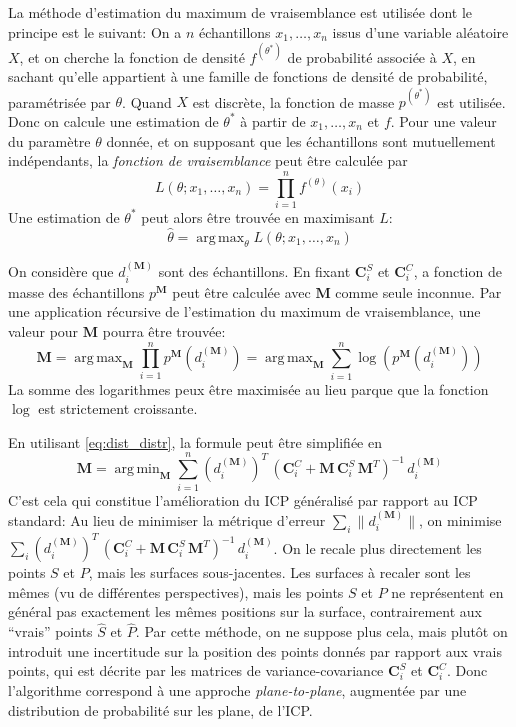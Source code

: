 \documentclass[a4paper,10pt]{scrreprt}
\DeclareMathOperator*{\argmax}{arg\,max}
\DeclareMathOperator*{\argmin}{arg\,min}
\begin{document}
La méthode d'estimation du maximum de vraisemblance est utilisée dont le principe est le suivant: On a $n$ échantillons $x_1, \ldots, x_n$ issus d'une variable aléatoire $X$, et on cherche la fonction de densité $f^{(\theta^*)}$ de probabilité associée à $X$, en sachant qu'elle appartient à une famille de fonctions de densité de probabilité, paramétrisée par $\theta$. Quand $X$ est discrète, la fonction de masse $p^{(\theta^*)}$ est utilisée. Donc on calcule une estimation de $\theta^*$ à partir de $x_1, \ldots, x_n$ et $f$. Pour une valeur du paramètre $\theta$ donnée, et on supposant que les échantillons sont mutuellement indépendants, la \emph{fonction de vraisemblance} peut être calculée par
\begin{equation}
	L(\theta; x_1, \ldots, x_n) = \prod_{i=1}^{n} f^{(\theta)}(x_i)
\end{equation}
Une estimation de $\theta^*$ peut alors être trouvée en maximisant $L$:
\begin{equation}
	\hat{\theta} = \argmax_{\theta} L(\theta; x_1, \ldots, x_n)
\end{equation}

On considère que $d^{(\mathbf{M})}_i$ sont des échantillons. En fixant $\mathbf{C}^S_i$ et $\mathbf{C}^C_i$, a fonction de masse des échantillons $p^{\mathbf{M}}$ peut être calculée avec $\mathbf{M}$ comme seule inconnue. Par une application récursive de l'estimation du maximum de vraisemblance, une valeur pour $\mathbf{M}$ pourra être trouvée:
\begin{equation}
	\mathbf{M}
	= \argmax_{\mathbf{M}} \prod_{i=1}^{n} p^{\mathbf{M}}(d^{(\mathbf{M})}_i)
	= \argmax_{\mathbf{M}} \sum_{i=1}^{n} \log(p^{\mathbf{M}}(d^{(\mathbf{M})}_i))
\end{equation}
La somme des logarithmes peux être maximisée au lieu parque que la fonction $\log$ est strictement croissante.

En utilisant \ref{eq:dist_distr}, la formule peut être simplifiée en
\begin{equation}
	\mathbf{M} = \argmin_{\mathbf{M}} \sum_{i=1}^{n}
	(d^{(\mathbf{M})}_i)^T \, (\mathbf{C}^C_i + \mathbf{M}\,\mathbf{C}^S_i\,\mathbf{M}^T)^{-1} \, d^{(\mathbf{M})}_i
\end{equation}
C'est cela qui constitue l'amélioration du ICP généralisé par rapport au ICP standard: Au lieu de minimiser la métrique d'erreur $\sum_i \| d^{(\mathbf{M})}_i \|$, on minimise $\sum_i (d^{(\mathbf{M})}_i)^T \, (\mathbf{C}^C_i + \mathbf{M}\,\mathbf{C}^S_i\,\mathbf{M}^T)^{-1} \, d^{(\mathbf{M})}_i$. On le recale plus directement les points $S$ et $P$, mais les surfaces sous-jacentes. Les surfaces à recaler sont les mêmes (vu de différentes perspectives), mais les points $S$ et $P$ ne représentent en général pas exactement les mêmes positions sur la surface, contrairement aux  ``vrais'' points $\hat{S}$ et $\hat{P}$. Par cette méthode, on ne suppose plus cela, mais plutôt on introduit une incertitude sur la position des points donnés par rapport aux vrais points, qui est décrite par les matrices de variance-covariance $\mathbf{C}^S_i$ et $\mathbf{C}^C_i$. Donc l'algorithme correspond à une approche \emph{plane-to-plane}, augmentée par une distribution de probabilité sur les plane, de l'ICP.
\end{document}
